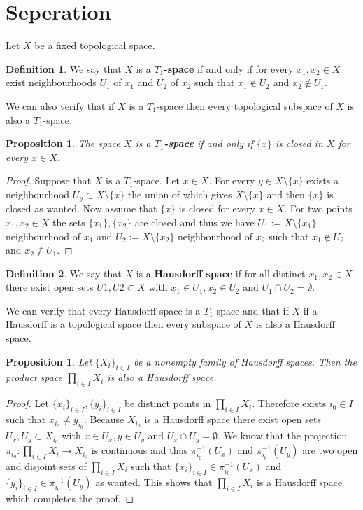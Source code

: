 \documentclass[11pt,a4paper]{article}
\theoremstyle{definition}
\newtheorem{definition}{Definition}[section]
\theoremstyle{plain}
\newtheorem{proposition}[theorem]{Proposition}
\begin{document}
  \newpage

  \section{Seperation}
  Let $X$ be a fixed topological space.
  \begin{definition}
    We say that $X$ is a $T_1$\textbf{-space} if and only if for every
    $x_1, x_2 \in X$ exist neighbourhoods $U_1$ of $x_1$ and $U_2$ of
    $x_2$ such that $x_1 \notin U_2$ and $x_2 \notin U_1$.
  \end{definition}
  We can also verify that if $X$ is a $T_1$-space then every topological
  subspace of $X$ is also a $T_1$-space.
  \begin{proposition}
    The space $X$ is a $T_1$\textbf{-space} if and only if $\{x\}$ is 
    closed in $X$ for every $x \in X$.
  \end{proposition}
  \begin{proof}
    Suppose that $X$ is a $T_1$-space. Let $x \in X$. For every 
    $y \in X \setminus \{x\}$ exists a neighbourhood 
    $U_y \subset X \setminus \{x\}$ the union of which gives 
    $X \setminus \{x\}$ and then $\{x\}$ is closed as wanted. Now
    assume that $\{x\}$ is closed for every $x \in X$. For two points
    $x_1,x_2 \in X$ the sets $\{x_1\},\{x_2\}$ are closed and thus
    we have $U_1 := X \setminus \{x_1\}$ neighbourhood of $x_1$ and
    $U_2 := X \setminus \{x_2\}$ neighbourhood of $x_2$ such that
    $x_1 \notin U_2$ and $x_2 \notin U_1$.
  \end{proof}
  \begin{definition}
    We say that $X$ is a \textbf{Hausdorff space} if for all distinct 
    $x_1, x_2 \in X$ there exist open sets $U1, U2 \subset X$ with 
    $x_1 \in U_1, x_2 \in U_2$ and $U_1 \cap U_2 = \emptyset$.
  \end{definition}
  We can verify that every Hausdorff space is a $T_1$-space and that if
  $X$ if a Hausdorff is a topological space then every subspace of $X$
  is also a Hausdorff space.
  \begin{proposition}
    Let $\{X_i\}_{i \in I}$ be a nonempty family of Hausdorff spaces. 
    Then the product space $\prod_{i \in I}{X_i}$ is also a Hausdorff 
    space.
  \end{proposition}
  \begin{proof}
    Let $\{x_i\}_{i \in I}, \{y_i\}_{i \in I}$ be distinct points
    in $\prod_{i \in I}{X_i}$. Therefore exists $i_0 \in I$ such that
    $x_{i_0} \neq y_{i_0}$. Because $X_{i_0}$ is a Hausdorff space 
    there exist open sets $U_x, U_y \subset X_{i_0}$ with 
    $x \in U_x, y \in U_y$ and $U_x \cap U_y = \emptyset$. We know that
    the projection $\pi_{i_0} \colon \prod_{i \in I}{X_i} \to X_{i_0}$
    is continuous and thus $\pi_{i_0}^{-1}(U_x)$ and $\pi_{i_0}^{-1}(U_y)$
    are two open and disjoint sets of $\prod_{i \in I}{X_i}$ such
    that $\{x_i\}_{i \in I} \in \pi_{i_0}^{-1}(U_x)$ and 
    $\{y_i\}_{i \in I} \in \pi_{i_0}^{-1}(U_y)$ as wanted. This shows
    that $\prod_{i \in I}{X_i}$ is a Hausdorff space which completes
    the proof.
  \end{proof}
\end{document}
